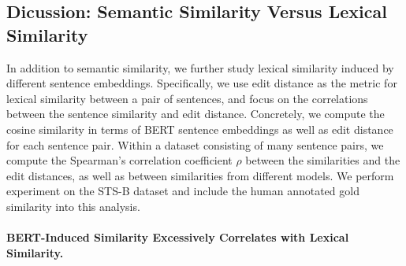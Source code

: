 \documentclass[11pt,a4paper]{article}
\begin{document}
\subsection{Dicussion: Semantic Similarity Versus Lexical Similarity }
\label{sec:lexical:similarity}



In addition to semantic similarity, we further study lexical similarity induced by different sentence embeddings. Specifically, we use edit distance as the metric for lexical similarity between a pair of sentences, and focus on the correlations between the sentence similarity and edit distance. Concretely, we compute the cosine similarity in terms of BERT sentence embeddings as well as edit distance for each sentence pair. Within a dataset consisting of many sentence pairs, we compute the Spearman's correlation coefficient $\rho$ between the similarities and the edit distances, as well as between similarities from different models. We perform experiment on the STS-B dataset and include the human annotated gold similarity into this analysis.

\paragraph{BERT-Induced Similarity Excessively Correlates with Lexical Similarity.}






\begin{table}[!t]
\centering
{}
\caption{\label{tab:editdistance} Spearman's correlation $\rho$ between various sentence similarities on the validation set of STS-B. We can observe that BERT-induced similarity is highly correlated to edit distance, while the correlation with edit distance is less evident for gold standard or flow-induced similarity. }
\end{table}
\end{document}

